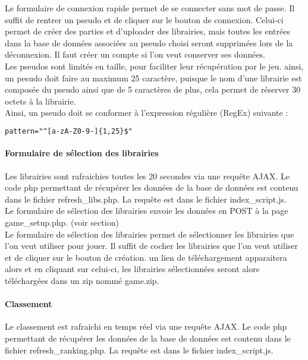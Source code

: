 \documentclass[12pt, openany]{article}
\begin{document}
	Le formulaire de connexion rapide permet de se connecter sans mot de passe. Il suffit de rentrer un pseudo et de cliquer sur le bouton de connexion. Celui-ci permet de créer des parties et d'uploader des librairies, mais toutes les entrées dans la base de données associées au pseudo choisi seront supprimées lors de la déconnexion. Il faut créer un compte si l'on veut conserver ses données.\\
	Les pseudos sont limités en taille, pour faciliter leur récupération par le jeu. ainsi, un pesudo doit faire au maximum 25 caractère, puisque le nom d'une librairie est composée du pseudo ainsi que de 5 caractères de plus, cela permet de réserver 30 octets à la librairie.\\
	Ainsi, un pseudo doit se conformer à l'expression régulière (RegEx) suivante :\\
	\begin{lstlisting}[language=html]
		pattern="^[a-zA-Z0-9-]{1,25}$"
	\end{lstlisting} 
	\paragraph{Formulaire de sélection des librairies}
	Les librairies sont rafraichies toutes les 20 secondes via une requête AJAX. Le code php permettant de récupérer les données de la base de données est contenu dans le fichier refresh\_libs.php. La requête est dans le fichier index\_script.js.\\
	Le formulaire de sélection des librairies envoie les données en POST à la page game\_setup.php. (voir section)\\
	Le formulaire de sélection des librairies permet de sélectionner les librairies que l'on veut utiliser pour jouer. Il suffit de cocher les librairies que l'on veut utiliser et de cliquer sur le bouton de création. un lien de téléchargement apparaitera alors et en cliquant sur celui-ci, les librairies sélectionnées seront alors téléchargées dans un zip nommé game.zip.\\

	\paragraph{Classement}
	Le classement est rafraichi en temps réel via une requête AJAX. Le code php permettant de récupérer les données de la base de données est contenu dans le fichier refresh\_ranking.php. La requête est dans le fichier index\_script.js.\\
\end{document}
